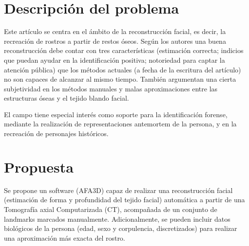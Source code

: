 \documentclass[13pt,a4paper]{article}
\begin{document}
    
    

    \newpage


\section{Descripción del problema}
Este artículo se centra en el ámbito de la reconstrucción facial, es decir, la recreación de rostros a partir de restos óseos. Según los autores una buena reconstrucción debe contar con tres características (estimación correcta; indicios que puedan ayudar en la identificación positiva; notoriedad para captar la atención pública) que los métodos actuales (a fecha de la escritura del artículo) no son capaces de alcanzar al mismo tiempo. También argumentan una cierta subjetividad en los métodos manuales y malas aproximaciones entre las estructuras óseas y el tejido blando facial.

El campo tiene especial interés como soporte para la identificación forense, mediante la realización de representaciones antemortem de la persona, y en la recreación de personajes históricos.

\section{Propuesta}




Se propone un software (AFA3D) capaz de realizar una reconstrucción facial (estimación de forma y profundidad del tejido facial) automática a partir de una Tomografía axial Computarizada (CT), acompañada de un conjunto de landmarks marcados manualmente. Adicionalmente, se pueden incluir datos biológicos de la persona (edad, sexo y corpulencia, discretizados) para realizar una aproximación más exacta del rostro.
\end{document}
